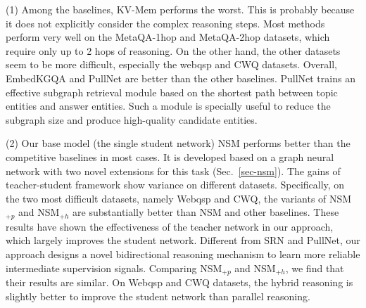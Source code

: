 (1) Among the baselines, KV-Mem performs the worst.
This is probably because it does not explicitly consider the complex 
reasoning steps.
Most methods perform very well on the MetaQA-1hop and MetaQA-2hop datasets, which require only up to 2 hops of reasoning.
On the other hand, the other datasets seem to be more difficult, especially the webqsp and CWQ datasets. 
Overall, EmbedKGQA and PullNet are better than the other baselines. 
PullNet trains an effective subgraph retrieval module based
on the shortest path between topic entities and answer entities. 
Such a module is specially useful to reduce the subgraph size and produce high-quality candidate entities.









(2) Our base model (\ie the single student network) NSM performs better than the competitive baselines in most cases. It is developed based on a graph neural network with two novel extensions for this task (Sec.~\ref{sec-nsm}).  
The gains of teacher-student framework show variance on different datasets. 
Specifically, on the two most difficult datasets, namely Webqsp and CWQ, the variants of NSM$_{+p}$ and NSM$_{+h}$ are substantially better than NSM and other baselines. 
These results have shown the effectiveness of the teacher network in our approach, which largely improves the student network. 
Different from SRN and PullNet, our approach designs a novel bidirectional reasoning mechanism to learn more reliable intermediate supervision signals.
Comparing NSM$_{+p}$ and NSM$_{+h}$, we find that their results are similar. On Webqsp and CWQ datasets, the hybrid reasoning is slightly better to improve the student network than parallel reasoning.

